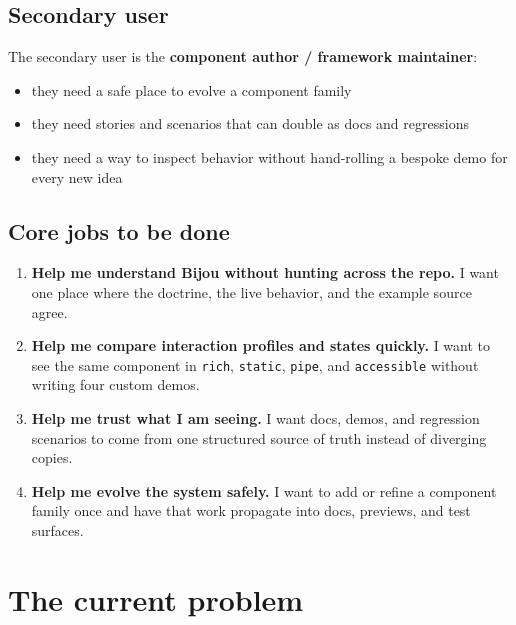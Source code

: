 \subsection{Secondary user}\label{record-042-secondary-user}

The secondary user is the \textbf{component author / framework maintainer}:

\begin{itemize}
\tightlist
\item
  they need a safe place to evolve a component family
\item
  they need stories and scenarios that can double as docs and regressions
\item
  they need a way to inspect behavior without hand-rolling a bespoke demo for every new idea
\end{itemize}

\subsection{Core jobs to be done}\label{record-042-core-jobs-to-be-done}

\begin{enumerate}
\def\labelenumi{\arabic{enumi}.}
\item
  \textbf{Help me understand Bijou without hunting across the repo.} I want one place where the doctrine, the live behavior, and the example source agree.
\item
  \textbf{Help me compare interaction profiles and states quickly.} I want to see the same component in \texttt{r\allowbreak{}i\allowbreak{}c\allowbreak{}h}, \texttt{s\allowbreak{}t\allowbreak{}a\allowbreak{}t\allowbreak{}i\allowbreak{}c}, \texttt{p\allowbreak{}i\allowbreak{}p\allowbreak{}e}, and \texttt{a\allowbreak{}c\allowbreak{}c\allowbreak{}e\allowbreak{}s\allowbreak{}s\allowbreak{}i\allowbreak{}b\allowbreak{}l\allowbreak{}e} without writing four custom demos.
\item
  \textbf{Help me trust what I am seeing.} I want docs, demos, and regression scenarios to come from one structured source of truth instead of diverging copies.
\item
  \textbf{Help me evolve the system safely.} I want to add or refine a component family once and have that work propagate into docs, previews, and test surfaces.
\end{enumerate}

\section{The current problem}\label{record-042-the-current-problem}

